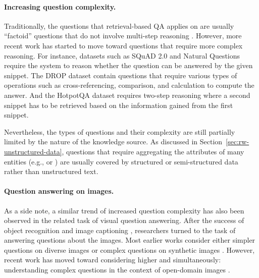 \paragraph{Increasing question complexity.}
Traditionally,
the questions that retrieval-based QA applies on
are usually ``factoid'' questions
that do not involve multi-step reasoning
\cite{voorhees1999overview,brill2002askmsr,pasca2003open}.
However,
more recent work has started to move toward
questions that require more complex reasoning.
For instance,
datasets such as SQuAD 2.0 \cite{rajpurkar2018squadrun}
and Natural Questions \cite{kwiatkowski2019natural}
require the system to reason whether the question can be answered
by the given snippet.
The DROP dataset \cite{dua2019drop}
contain questions that require various types of operations
such as cross-referencing, comparison, and calculation
to compute the answer.
And the HotpotQA dataset \cite{yang2018hotpotqa}
requires two-step reasoning
where a second snippet has to be retrieved
based on the information gained from the first snippet.

Nevertheless, the types of questions and their complexity
are still partially limited by the nature of the knowledge source.
As discussed in Section~\ref{sec:rw-unstructured-data},
questions that require aggregating the attributes
of many entities 
(e.g., 
or ) are usually covered by structured
or semi-structured data rather than unstructured text.

\paragraph{Question answering on images.}
As a side note,
a similar trend of increased question complexity
has also been observed
in the related task of visual question answering.
After the success of object recognition
\cite{krizhevsky2012imagenet,szegedy2015googlenet,he2016resnet}
and image captioning
\cite{farhadi2010every,lin2014microsoft,fang2015captions,mao2015deep},
researchers turned to the task of answering questions about the images.
Most earlier works consider
either simpler questions on diverse images \cite{antol2015vqa}
or complex questions on synthetic images \cite{johnson2017clevr,suhr2017nlvr}.
However, recent work has moved toward considering
higher \Breadth and \Depth simultaneously:
understanding complex questions
in the context of open-domain images
\cite{suhr2018situated,hudson2019gqa}.

